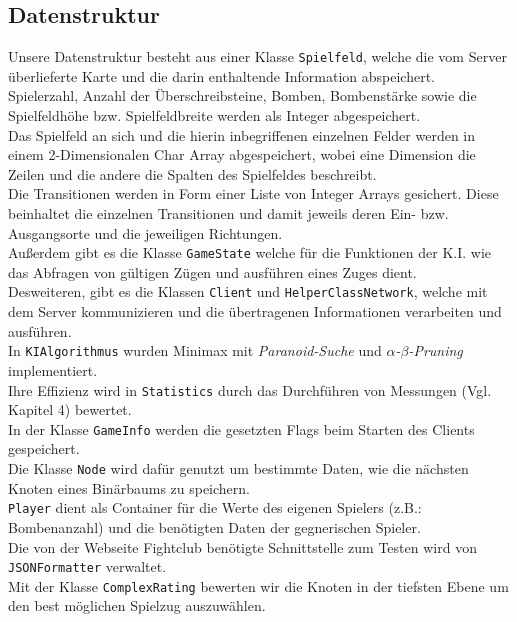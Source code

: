\documentclass[12pt,a4paper,bibliography=totocnumbered,listof=totocnumbered,ngerman]{scrartcl}
\begin{document}
\subsection{Datenstruktur}
Unsere Datenstruktur besteht aus einer Klasse \texttt{Spielfeld}, welche die vom Server überlieferte Karte und die darin enthaltende Information abspeichert. \\
Spielerzahl, Anzahl der Überschreibsteine, Bomben, Bombenstärke sowie die Spielfeldhöhe bzw. Spielfeldbreite werden als Integer abgespeichert. \\
Das Spielfeld an sich und die hierin inbegriffenen einzelnen Felder werden in einem 2-Dimensionalen Char Array abgespeichert, wobei eine Dimension die Zeilen und die andere die Spalten des Spielfeldes beschreibt. \\
Die Transitionen werden in Form einer Liste von Integer Arrays gesichert. Diese beinhaltet die einzelnen Transitionen und damit jeweils deren Ein- bzw. Ausgangsorte und die jeweiligen Richtungen. \\
Außerdem gibt es die Klasse \texttt{GameState} welche für die Funktionen der K.I. wie das Abfragen von gültigen Zügen und ausführen eines Zuges dient. \\
Desweiteren, gibt es die Klassen \texttt{Client} und \texttt{HelperClassNetwork}, welche mit dem Server kommunizieren und die übertragenen Informationen verarbeiten und ausführen.\\ 
In \texttt{KIAlgorithmus} wurden Minimax mit \emph{Paranoid-Suche} und \emph{$\alpha$-$\beta$-Pruning} implementiert. \\
Ihre Effizienz wird in \texttt{Statistics} durch das Durchführen von Messungen (Vgl. Kapitel 4) bewertet. \\
In der Klasse \texttt{GameInfo} werden die gesetzten Flags beim Starten des Clients gespeichert. \\
Die Klasse \texttt{Node} wird dafür genutzt um bestimmte Daten, wie die nächsten Knoten eines Binärbaums zu speichern.   \\
\texttt{Player} dient als Container für die Werte des eigenen Spielers (z.B.: Bombenanzahl) und die benötigten Daten der gegnerischen Spieler. \\
Die von der Webseite Fightclub benötigte Schnittstelle zum Testen wird von \texttt{JSONFormatter} verwaltet. \\
Mit der Klasse \texttt{ComplexRating} bewerten wir die Knoten in der tiefsten Ebene um den best möglichen Spielzug auszuwählen. \\
\end{document}
